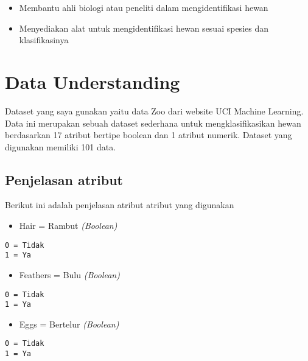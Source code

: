 \documentclass[
  letterpaper,
]{krantz}
\providecommand{\tightlist}{%
  \setlength{\itemsep}{0pt}\setlength{\parskip}{0pt}}\usepackage{longtable,booktabs,array}
\begin{document}
\begin{itemize}
\tightlist
\item
  Membantu ahli biologi atau peneliti dalam mengidentifikasi hewan
\item
  Menyediakan alat untuk mengidentifikasi hewan sesuai spesies dan
  klasifikasinya
\end{itemize}

\hypertarget{data-understanding}{%
\section{Data Understanding}\label{data-understanding}}

Dataset yang saya gunakan yaitu data Zoo dari website UCI Machine
Learning. Data ini merupakan sebuah dataset sederhana untuk
mengklasifikasikan hewan berdasarkan 17 atribut bertipe boolean dan 1
atribut numerik. Dataset yang digunakan memiliki 101 data.

\hypertarget{penjelasan-atribut}{%
\subsection{Penjelasan atribut}\label{penjelasan-atribut}}

Berikut ini adalah penjelasan atribut atribut yang digunakan

\begin{itemize}
\tightlist
\item
  Hair = Rambut \emph{(Boolean)}
\end{itemize}

\begin{verbatim}
0 = Tidak
1 = Ya
\end{verbatim}

\begin{itemize}
\tightlist
\item
  Feathers = Bulu \emph{(Boolean)}
\end{itemize}

\begin{verbatim}
0 = Tidak
1 = Ya
\end{verbatim}

\begin{itemize}
\tightlist
\item
  Eggs = Bertelur \emph{(Boolean)}
\end{itemize}

\begin{verbatim}
0 = Tidak
1 = Ya
\end{verbatim}
\end{document}
